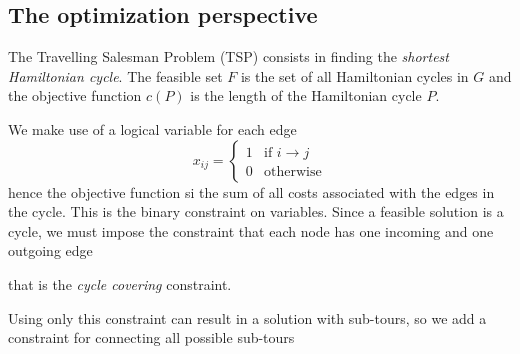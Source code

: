 \subsection{The optimization perspective}

The Travelling Salesman Problem (TSP) consists in finding the \emph{shortest Hamiltonian cycle}. The feasible set $F$ is the set of all Hamiltonian cycles in $G$ and the objective function $c(P)$ is the length of the Hamiltonian cycle $P$.

We make use of a logical variable for each edge
\[
x_{ij}=
\begin{cases}
	1 & \text{if $i\rightarrow j$} \\
	0 & \text{otherwise}
\end{cases}
\]
hence the objective function si the sum of all costs associated with the edges in the cycle. This is the binary constraint on variables. Since a feasible solution is a cycle, we must impose the constraint that each node has one incoming and one outgoing edge

\begin{center}
\end{center}
that is the \emph{cycle covering} constraint.

Using only this constraint can result in a solution with sub-tours, so we add a constraint for connecting all possible sub-tours


